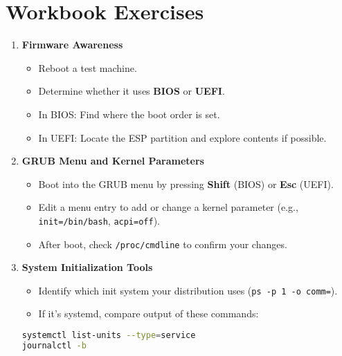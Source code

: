 \documentclass[a4paper]{report}
\begin{document}
\section*{Workbook Exercises}

\begin{enumerate}
    \item \textbf{Firmware Awareness}
    \begin{itemize}
        \item Reboot a test machine.
        \item Determine whether it uses \textbf{BIOS} or \textbf{UEFI}.
        \item In BIOS: Find where the boot order is set.
        \item In UEFI: Locate the ESP partition and explore contents if possible.
    \end{itemize}
    \item \textbf{GRUB Menu and Kernel Parameters}
    \begin{itemize}
        \item Boot into the GRUB menu by pressing \textbf{Shift} (BIOS) or \textbf{Esc} (UEFI).
        \item Edit a menu entry to add or change a kernel parameter (e.g., \texttt{init=/bin/bash}, \texttt{acpi=off}).
        \item After boot, check \texttt{/proc/cmdline} to confirm your changes.
    \end{itemize}
    \item \textbf{System Initialization Tools}
    \begin{itemize}
        \item Identify which init system your distribution uses (\texttt{ps -p 1 -o comm=}).
        \item If it’s systemd, compare output of these commands:
\end{itemize}

\begin{lstlisting}[language=bash]
systemctl list-units --type=service
journalctl -b
\end{lstlisting}


\end{enumerate}
\end{document}
